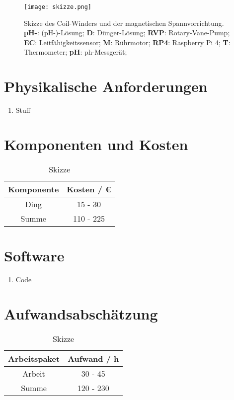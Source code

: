 \begin{figure}[H]
    \centering
    \texttt{[image: skizze.png]}
    \caption{
        Skizze des Coil-Winders und der magnetischen Spannvorrichtung.
        \textbf{pH-}: (pH-)-Lösung; 
        \textbf{D}: Dünger-Lösung; 
        \textbf{RVP}: Rotary-Vane-Pump; 
        \textbf{EC}: Leitfähigkeitssensor; 
        \textbf{M}: Rührmotor; 
        \textbf{RP4}: Raspberry Pi 4; 
        \textbf{T}: Thermometer; 
        \textbf{pH}: ph-Messgerät;
    }
\end{figure}

\section*{Physikalische Anforderungen}
\begin{enumerate}
    \item Stuff
\end{enumerate}


\section*{Komponenten und Kosten}
\begin{table}[H]
    \centering
    \caption{
        Skizze
    }
    \begin{tabular}{| c | c |}
        \hline
        Komponente &  Kosten / \euro{}\\
        \hline
        Ding & 15 - 30  \\
        \hline
        \hline
        Summe & 110 - 225  \\
        \hline
    \end{tabular}
    \label{tab:Komponenten}
\end{table}


\section*{Software}
\begin{enumerate}
    \item Code
\end{enumerate}

\section*{Aufwandsabschätzung}
\begin{table}[H]
    \centering
    \caption{
        Skizze
    }
    \begin{tabular}{| c | c |}
        \hline
        Arbeitspaket &  Aufwand / h\\
        \hline
        Arbeit & 30 - 45  \\
        \hline
        \hline
        Summe & 120 - 230  \\
        \hline
    \end{tabular}
    \label{tab:Aufwand}
\end{table}